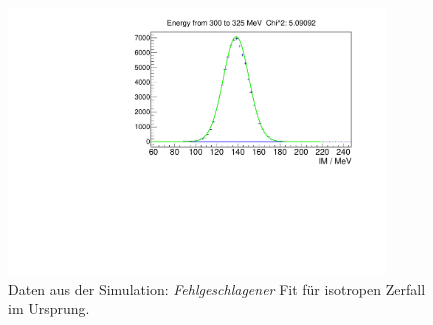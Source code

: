\documentclass[a4paper,11pt,oneside,final,german,openbib,pdftex]{scrbook}
\begin{document}
{\begin{appendix}

\begin{figure}[h!]
	\begin{center}
		\includegraphics[width=100mm]{20172804IsotropUrsprungFitFail}
		\end{center}
	\caption[Fehlgeschlagener Fit Isotrop Urspung]{Daten aus der Simulation: \textit{Fehlgeschlagener} Fit f\"ur isotropen Zerfall im Ursprung.}
	\label{fig:Isotrop-Fit-Fail}
\end{figure}




\end{appendix}}
\end{document}
